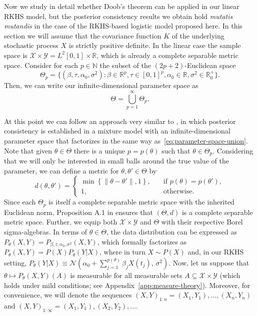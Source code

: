 \documentclass{article}
\numberwithin{equation}{section}
\theoremstyle{plain}
\newcommand{\N}{\mathbb{N}}
\newcommand{\R}{\mathbb{R}}
\begin{document}
Now we study in detail whether Doob's theorem can be applied in our linear RKHS model, but the posterior consistency results we obtain hold \textit{mutatis mutandis} in the case of the RKHS-based logistic model proposed here. In this section we will assume that the covariance function \(K\) of the underlying stochastic process \(X\) is strictly positive definite. In the linear case the sample space is \(\mathcal X \times \mathcal Y = L^2[0,1]\times \R\), which is already a complete separable metric space. Consider for each \(p\in\N\) the subset of the \((2p+2)\)-Euclidean space
\[
  \Theta_p = \{(\beta, \tau, \alpha_0, \sigma^2): \beta \in \R^p, \tau \in [0,1]^p, \alpha_0\in \R, \sigma^2 \in \R^+_0\}.
\]
Then, we can write our infinite-dimensional parameter space as
\begin{equation}\label{eq:parameter-space-union}
  \Theta = \bigcup_{p=1}^\infty \Theta_p.
\end{equation}

At this point we can follow an approach very similar to \citet{miller2023consistency}, in which posterior consistency is established in a mixture model with an infinite-dimensional parameter space that factorizes in the same way as~\eqref{eq:parameter-space-union}. Note that given \(\theta \in \Theta\) there is a unique \(p=p(\theta)\) such that \(\theta \in \Theta_p\). Considering that we will only be interested in small balls around the true value of the parameter, we can define a metric for \(\theta, \theta' \in \Theta\) by
\[
  d(\theta, \theta')= \begin{cases}
    \min \left\{\|\theta - \theta'\|, 1\right\}, \quad & \text{if } p(\theta)=p(\theta'), \\
    1, \quad                                           & \text{otherwise}.
  \end{cases}
\]
Since each \(\Theta_p\) is itself a complete separable metric space with the inherited Euclidean norm, Proposition A.1 in \citet{miller2023consistency} ensures that \((\Theta, d)\) is a complete separable metric space. Further, we equip both \(\mathcal X \times \mathcal Y\) and \(\Theta\) with their respective Borel sigma-algebras. In terms of \(\theta\in\Theta\), the data distribution can be expressed as \(P_\theta(X,Y)=P_{\beta, \tau, \alpha_0, \sigma^2}(X,Y)\), which formally factorizes as \(P_{\theta}(X,Y)=P(X)P_\theta(Y|X)\), where in turn \(X \sim P(X)\) and, in our RKHS setting, \(P_\theta(Y|X) \equiv \mathcal N(\alpha_0 + \sum_{j=1}^{p(\theta)}\beta_j X(t_j),\, \sigma^2)\). Now, let us suppose that \(\theta\mapsto P_\theta(X, Y)(A)\) is measurable for all measurable sets \(A\subseteq \mathcal X\times \mathcal Y\) (which holds under mild conditions; see Appendix~\ref{app:measure-theory}). Moreover, for convenience, we will denote the sequences \((X,Y)_{1:n} = (X_1,Y_1), \dots, (X_n, Y_n)\) and \((X,Y)_{1:\infty} = (X_1, Y_1), (X_2, Y_2), \dots\).
\end{document}
